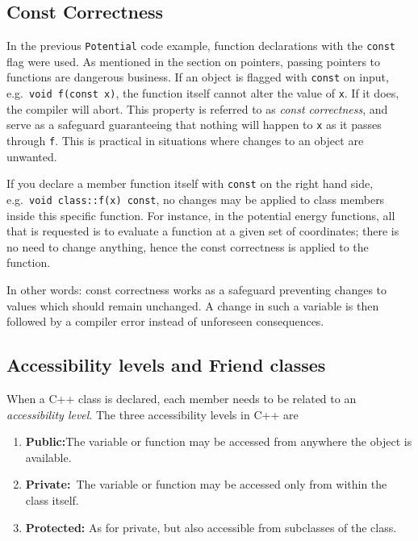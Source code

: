 \subsection{Const Correctness}

In the previous \verb+Potential+ code example, function declarations with the \verb+const+ flag were used. As mentioned in the section on pointers, passing pointers to functions are dangerous business. If an object is flagged with \verb+const+ on input, e.g.~\verb+void f(const x)+, the function itself cannot alter the value of \verb+x+. If it does, the compiler will abort. This property is referred to as \textit{const correctness}, and serve as a safeguard guaranteeing that nothing will happen to \verb+x+ as it passes through \verb+f+. This is practical in situations where changes to an object are unwanted.

If you declare a member function itself with \verb+const+ on the right hand side, e.g.~\verb+void class::f(x) const+, no changes may be applied to class members inside this specific function. For instance, in the potential energy functions, all that is requested is to evaluate a function at a given set of coordinates; there is no need to change anything, hence the const correctness is applied to the function. 

In other words: const correctness works as a safeguard preventing changes to values which should remain unchanged. A change in such a variable is then followed by a compiler error instead of unforeseen consequences.

\subsection{Accessibility levels and Friend classes}

When a C++ class is declared, each member needs to be related to an \textit{accessibility level}. The three accessibility levels in C++ are 

\begin{enumerate}[label=\textbf{(\roman{*})}, ref=(\roman{*}), align=left]
 \item \textbf{Public:}\qquad The variable or function may be accessed from anywhere the object is available.
 \item \textbf{Private:}\quad\, The variable or function may be accessed only from within the class itself. 
 \item \textbf{Protected:} As for private, but also accessible from subclasses of the class.
 \label{enum:accessibilityLevels}
 \vspace{0.3cm}
\end{enumerate}

